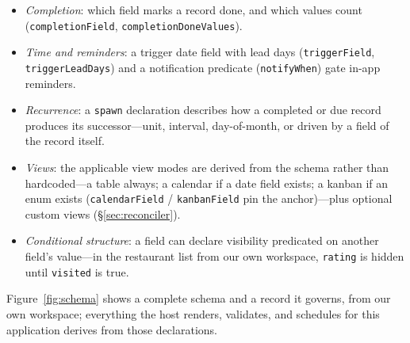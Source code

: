 \documentclass[11pt]{article}
\newcommand{\code}[1]{\texttt{\small #1}}
\begin{document}
\begin{itemize}
  \item \emph{Completion}: which field marks a record done, and which values
  count (\code{completionField}, \code{completionDoneValues}).
  \item \emph{Time and reminders}: a trigger date field with lead days
  (\code{triggerField}, \code{triggerLeadDays}) and a notification predicate
  (\code{notifyWhen}) gate in-app reminders.
  \item \emph{Recurrence}: a \code{spawn} declaration describes how a completed
  or due record produces its successor---unit, interval, day-of-month, or driven
  by a field of the record itself.
  \item \emph{Views}: the applicable view modes are derived from the schema
  rather than hardcoded---a table always; a calendar if a date field exists; a
  kanban if an enum exists (\code{calendarField} / \code{kanbanField} pin the
  anchor)---plus optional custom views (\S\ref{sec:reconciler}).
  \item \emph{Conditional structure}: a field can declare visibility predicated
  on another field's value---in the restaurant list from our own workspace,
  \code{rating} is hidden until \code{visited} is true.
\end{itemize}

Figure~\ref{fig:schema} shows a complete schema and a record it governs, from
our own workspace; everything the host renders, validates, and schedules for
this application derives from those declarations.
\end{document}

